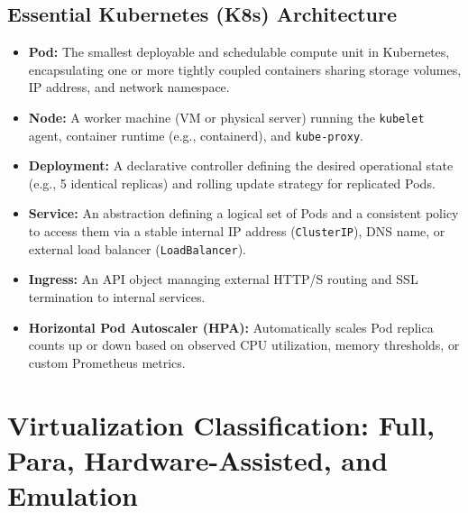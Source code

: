 \subsection{Essential Kubernetes (K8s) Architecture}
\begin{itemize}
    \item \textbf{Pod:} The smallest deployable and schedulable compute unit in Kubernetes, encapsulating one or more tightly coupled containers sharing storage volumes, IP address, and network namespace.
    \item \textbf{Node:} A worker machine (VM or physical server) running the \texttt{kubelet} agent, container runtime (e.g., containerd), and \texttt{kube-proxy}.
    \item \textbf{Deployment:} A declarative controller defining the desired operational state (e.g., 5 identical replicas) and rolling update strategy for replicated Pods.
    \item \textbf{Service:} An abstraction defining a logical set of Pods and a consistent policy to access them via a stable internal IP address (\texttt{ClusterIP}), DNS name, or external load balancer (\texttt{LoadBalancer}).
    \item \textbf{Ingress:} An API object managing external HTTP/S routing and SSL termination to internal services.
    \item \textbf{Horizontal Pod Autoscaler (HPA):} Automatically scales Pod replica counts up or down based on observed CPU utilization, memory thresholds, or custom Prometheus metrics.
\end{itemize}


\section{Virtualization Classification: Full, Para, Hardware-Assisted, and Emulation}
\label{sec:virtualization_classification}

